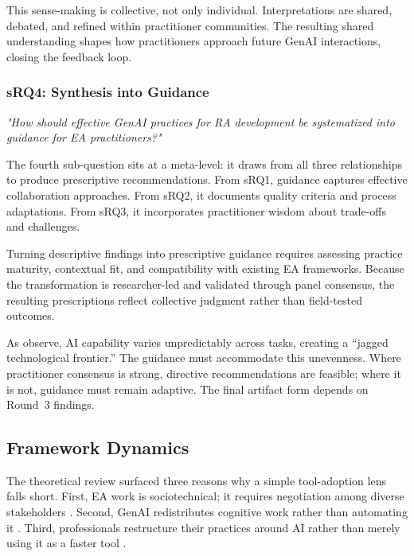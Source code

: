 This sense-making is collective, not only individual. Interpretations are
shared, debated, and refined within practitioner communities. The resulting
shared understanding shapes how practitioners approach future GenAI
interactions, closing the feedback loop.

\subsubsection{sRQ4: Synthesis into Guidance}

\textit{"How should effective GenAI practices for RA development be systematized into guidance for EA practitioners?"}
\vspace{0.5em}

The fourth sub-question sits at a meta-level: it draws from all three
relationships to produce prescriptive recommendations. From sRQ1, guidance
captures effective collaboration approaches. From sRQ2, it documents quality
criteria and process adaptations. From sRQ3, it incorporates practitioner wisdom
about trade-offs and challenges.

Turning descriptive findings into prescriptive guidance requires assessing
practice maturity, contextual fit, and compatibility with existing EA
frameworks. Because the transformation is researcher-led and validated through
panel consensus, the resulting prescriptions reflect collective judgment rather
than field-tested outcomes.

As \textcite{dellacqua_navigating_2023} observe, AI capability varies
unpredictably across tasks, creating a ``jagged technological frontier.'' The
guidance must accommodate this unevenness. Where practitioner consensus is
strong, directive recommendations are feasible; where it is not, guidance must
remain adaptive. The final artifact form depends on Round~3 findings.

\subsection{Framework Dynamics}\label{subsec:framework-dynamics}

The theoretical review surfaced three reasons why a simple tool-adoption lens
falls short. First, EA work is sociotechnical; it requires negotiation among
diverse stakeholders \parencite{saint-louis_investigation_2019}. Second, GenAI
redistributes cognitive work rather than automating it
\parencite{dellacqua_navigating_2023}. Third, professionals restructure their
practices around AI rather than merely using it as a faster tool
\parencite{noy_experimental_2023}.

